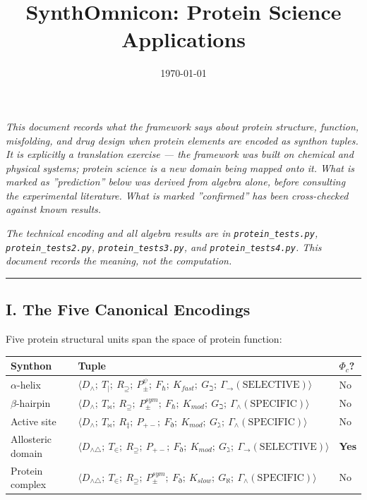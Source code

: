 \documentclass[12pt,a4paper]{article}
\begin{document}
\title{SynthOmnicon: Protein Science Applications}
\date{\today}

\maketitle

\emph{This document records what the framework says about protein structure, function, misfolding, and drug design when protein elements are encoded as synthon tuples. It is explicitly a translation exercise --- the framework was built on chemical and physical systems; protein science is a new domain being mapped onto it. What is marked as ''prediction'' below was derived from algebra alone, before consulting the experimental literature. What is marked ''confirmed'' has been cross-checked against known results.}

\emph{The technical encoding and all algebra results are in \texttt{protein\_tests.py}, \texttt{protein\_tests2.py}, \texttt{protein\_tests3.py}, and \texttt{protein\_tests4.py}. This document records the meaning, not the computation.}

\begin{center}
\rule{0.5\textwidth}{0.4pt}
\end{center}

\subsection{I. The Five Canonical Encodings}

Five protein structural units span the space of protein function:

\begin{table}[htbp]
\centering
\small
{}
\begin{tabularx}{\textwidth}{>{\centering\arraybackslash}X >{\centering\arraybackslash}X >{\centering\arraybackslash}X}
\toprule
\rowcolor{gray!25}\textbf{Synthon} & \textbf{Tuple} & \textbf{$\Phi_c$?} \\
\midrule
\rowcolors{1}{white}{gray!10}
$\alpha$-helix & $\langle D_\wedge;\ T_{\vert};\ R_\supseteq;\ P_\pm^\psi;\ F_\hbar;\ K_{fast};\ G_\beth;\ \Gamma_\to(\text{SELECTIVE})\rangle$ & No \\
$\beta$-hairpin & $\langle D_\wedge;\ T_\bowtie;\ R_\supseteq;\ P_\pm^{sym};\ F_\hbar;\ K_{mod};\ G_\beth;\ \Gamma_\wedge(\text{SPECIFIC})\rangle$ & No \\
Active site & $\langle D_\wedge;\ T_\bowtie;\ R_\ddagger;\ P_{+-};\ F_\eth;\ K_{mod};\ G_\gimel;\ \Gamma_\wedge(\text{SPECIFIC})\rangle$ & No \\
Allosteric domain & $\langle D_{\wedge\triangle};\ T_\in;\ R_\supseteq;\ P_{+-};\ F_\eth;\ K_{mod};\ G_\gimel;\ \Gamma_\to(\text{SELECTIVE})\rangle$ & \textbf{Yes} \\
Protein complex & $\langle D_{\wedge\triangle};\ T_\in;\ R_\supseteq;\ P_\pm^{sym};\ F_\eth;\ K_{slow};\ G_\aleph;\ \Gamma_\wedge(\text{SPECIFIC})\rangle$ & No \\
\bottomrule
\end{tabularx}
\end{table}
\end{document}
